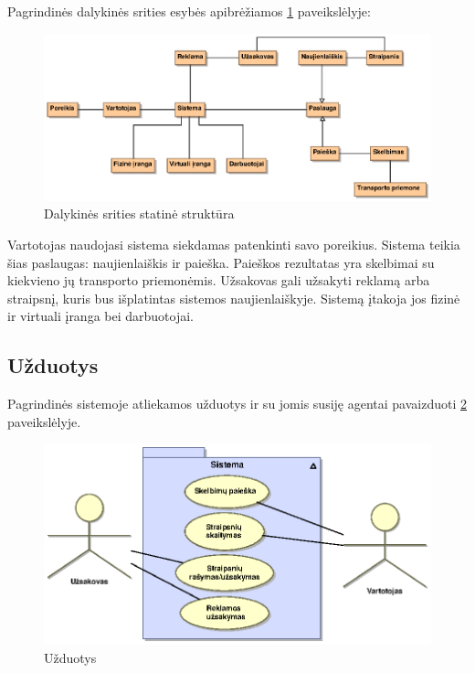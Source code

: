 \documentclass[12pt]{article}
\begin{document}
	Pagrindinės dalykinės srities esybės apibrėžiamos \ref{StaticStruct} paveikslėlyje:
	
	\begin{figure}[h]
		\begin{center}
			\includegraphics[width=\textwidth]{StatineSchema.eps}
			\caption{Dalykinės srities statinė struktūra\label{StaticStruct}}
		\end{center}
	\end{figure}

	Vartotojas naudojasi sistema siekdamas patenkinti savo poreikius. Sistema teikia šias paslaugas: naujienlaiškis ir paieška. Paieškos rezultatas yra skelbimai su kiekvieno jų transporto priemonėmis. Užsakovas gali užsakyti reklamą arba straipsnį, kuris bus išplatintas sistemos naujienlaiškyje. Sistemą įtakoja jos fizinė ir virtuali įranga bei darbuotojai.
	\pagebreak
	
	\subsection{Užduotys}
	
	 Pagrindinės sistemoje atliekamos užduotys ir su jomis susiję agentai pavaizduoti \ref{UseCase3} paveikslėlyje.
	
	
	\begin{figure}[h]
		\begin{center}
			\includegraphics[width=\textwidth]{AnalUzduotys.eps}
			\caption{Užduotys\label{UseCase3}}
		\end{center}
	\end{figure}
	
\end{document}

